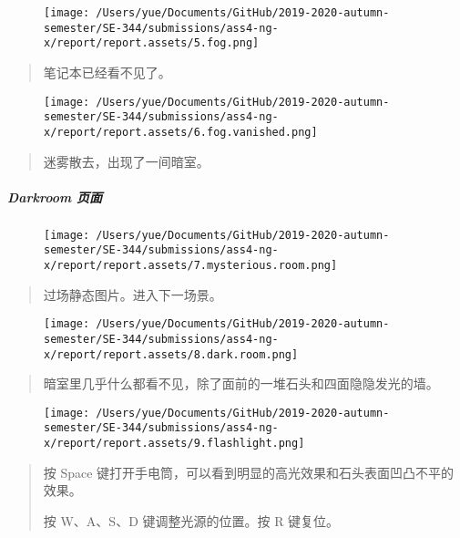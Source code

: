 \documentclass[
]{article}
\begin{document}
\begin{figure}
\centering
\texttt{[image: /Users/yue/Documents/GitHub/2019-2020-autumn-semester/SE-344/submissions/ass4-ng-x/report/report.assets/5.fog.png]}
\caption{}
\end{figure}

\begin{quote}
笔记本已经看不见了。
\end{quote}

\begin{figure}
\centering
\texttt{[image: /Users/yue/Documents/GitHub/2019-2020-autumn-semester/SE-344/submissions/ass4-ng-x/report/report.assets/6.fog.vanished.png]}
\caption{}
\end{figure}

\begin{quote}
迷雾散去，出现了一间暗室。
\end{quote}

\hypertarget{header-n41}{%
\subparagraph{Darkroom 页面}\label{header-n41}}

\begin{figure}
\centering
\texttt{[image: /Users/yue/Documents/GitHub/2019-2020-autumn-semester/SE-344/submissions/ass4-ng-x/report/report.assets/7.mysterious.room.png]}
\caption{}
\end{figure}

\begin{quote}
过场静态图片。进入下一场景。
\end{quote}

\begin{figure}
\centering
\texttt{[image: /Users/yue/Documents/GitHub/2019-2020-autumn-semester/SE-344/submissions/ass4-ng-x/report/report.assets/8.dark.room.png]}
\caption{}
\end{figure}

\begin{quote}
暗室里几乎什么都看不见，除了面前的一堆石头和四面隐隐发光的墙。
\end{quote}

\begin{figure}
\centering
\texttt{[image: /Users/yue/Documents/GitHub/2019-2020-autumn-semester/SE-344/submissions/ass4-ng-x/report/report.assets/9.flashlight.png]}
\caption{}
\end{figure}

\begin{quote}
按 Space 键打开手电筒，可以看到明显的高光效果和石头表面凹凸不平的效果。

按 W、A、S、D 键调整光源的位置。按 R 键复位。
\end{quote}
\end{document}
